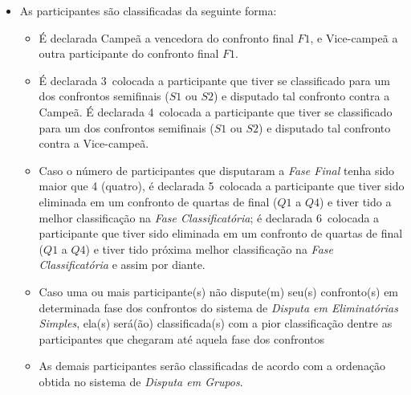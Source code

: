 \begin{itemize}[noitemsep]
	\item As participantes são classificadas da seguinte forma:
	\begin{itemize}[noitemsep]
		\item É declarada Campeã a vencedora do confronto final $F1$, e Vice-campeã a outra participante do confronto final $F1$.
		\item É declarada 3\ula\ colocada a participante que tiver se classificado para um dos confrontos semifinais ($S1$ ou $S2$) e disputado tal confronto contra a Campeã. É declarada 4\ula\ colocada a participante que tiver se classificado para um dos confrontos semifinais ($S1$ ou $S2$) e disputado tal confronto contra a Vice-campeã.
		\item Caso o número de participantes que disputaram a \textit{Fase Final} tenha sido maior que 4 (quatro), é declarada 5\ula\ colocada a participante que tiver sido eliminada em um confronto de quartas de final ($Q1$ a $Q4$) e tiver tido a melhor classificação na \textit{Fase Classificatória}; é declarada 6\ula\ colocada a participante que tiver sido eliminada em um confronto de quartas de final ($Q1$ a $Q4$) e tiver tido próxima melhor classificação na \textit{Fase Classificatória} e assim por diante.
		\item Caso uma ou mais participante(s) não dispute(m) seu(s) confronto(s) em determinada fase dos confrontos do sistema de \textit{Disputa em Eliminatórias Simples}, ela(s) será(ão) classificada(s) com a pior classificação dentre as participantes que chegaram até aquela fase dos confrontos
		\item As demais participantes serão classificadas de acordo com a ordenação obtida no sistema de \textit{Disputa em Grupos}.
	\end{itemize}
\end{itemize}

